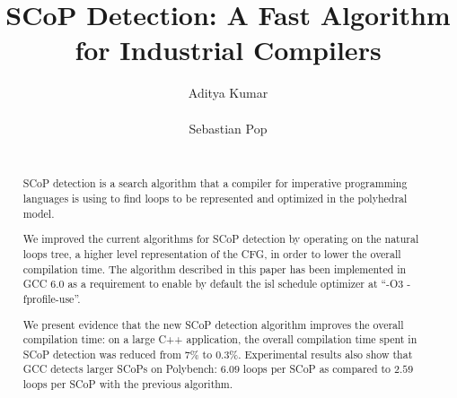 \documentclass{sig-alternate}
\begin{document}
\def \SCoP {SCoP}
\def \GCC {GCC}
\def \LLVM {LLVM}
\def \SESE {SESE}
\def \CFG {CFG}
\def \scev {scev}

\setlength{\pdfpageheight}{\paperheight}
\setlength{\pdfpagewidth}{\paperwidth}

\title{\SCoP{} Detection: A Fast Algorithm for Industrial Compilers}


\author{
\alignauthor
Aditya Kumar\\
       \\
\alignauthor
Sebastian Pop\\
       \\
}

\maketitle

\begin{abstract}
\SCoP{} detection is a search algorithm that a compiler for imperative programming
languages is using to find loops to be represented and optimized in the
polyhedral model.

We improved the current algorithms for \SCoP{} detection by operating on the
natural loops tree, a higher level representation of the \CFG{,} in order to lower
the overall compilation time.  The algorithm described in this paper has been
implemented in \GCC{} 6.0 as a requirement to enable by default the isl schedule
optimizer at ``-O3 -fprofile-use''.

We present evidence that the new \SCoP{} detection algorithm improves the overall
compilation time: on a large C++ application, the overall compilation time spent
in \SCoP{} detection was reduced from $7\%$ to $0.3\%$.  Experimental results also
show that \GCC{} detects larger \SCoP{s} on Polybench: $6.09$ loops per \SCoP{} as
compared to $2.59$ loops per \SCoP{} with the previous algorithm.
\end{abstract}
\end{document}
